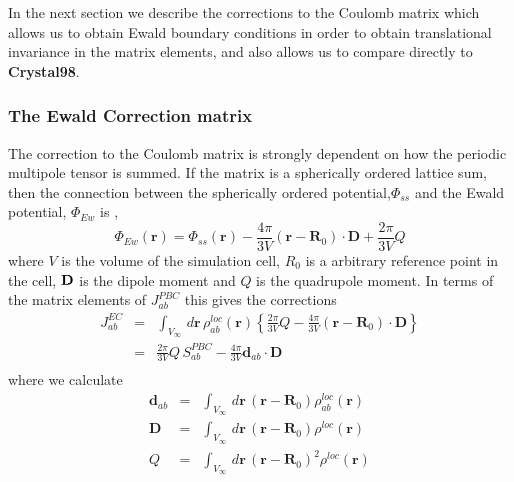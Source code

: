 \commentoutA{\documentclass[prb,aps,twocolumn,showpacs,twocolumngrid,superbib]{revtex4}}
\begin{document}
In the next section we describe the corrections to the Coulomb matrix
which allows us to obtain Ewald boundary conditions in order to obtain
translational invariance in the matrix elements, and also allows us
to compare directly to \textbf{Crystal98}. 

\subsubsection{The Ewald Correction matrix}

The correction to the Coulomb matrix is strongly dependent on how
the periodic multipole tensor is summed. If the matrix is a spherically
ordered lattice sum, then the connection between the spherically ordered
potential,$\Phi _{ss}$ and the Ewald potential, $\Phi _{Ew}$ is \cite{Redlack72}, 
\begin{equation}
\Phi _{Ew}\left( \mathbf{r}\right) =\Phi _{ss}\left( \mathbf{r}\right) -\frac{4\pi }{3V}
{\left( \mathbf{r}-\mathbf{R}_{0}\right) \cdot \mathbf{D}}+\frac{2\pi }{3V}Q
\label{EW_pot}
\end{equation}
where $V$ is the volume of the simulation cell, $R_0$ is a arbitrary reference point in the cell, 
${\bf D}$ is the dipole moment and $Q$ is the quadrupole moment.
In terms of the matrix elements of \( J_{ab}^{PBC} \) this gives
the corrections
\begin{eqnarray}
J_{ab}^{EC} & = & \int _{V_{\infty }}\, d{\mathbf{r}}\, \rho ^{loc}_{ab}\left( {\mathbf{r}}
\right) \left\{ \frac{2\pi }{3V}Q-\frac{4\pi }{3V}\left( \mathbf{r}-\mathbf{R}_{0}\right) \cdot 
\mathbf{D}\right\}
\nonumber\\
 & = & \frac{2\pi }{3V}Q\, S_{ab}^{PBC}-\frac{4\pi }{3V}\mathbf{d}_{ab}\cdot \mathbf{D}
\nonumber\\
\label{Jab_ec_2} 
\end{eqnarray}
where we calculate
%
\begin{eqnarray}
{\mathbf{d}}_{ab} & = & \int _{V_{\infty }}\, d{\mathbf{r}}\, \left( \mathbf{r}-\mathbf{R}_{0}\right)
 \rho ^{loc}_{ab}\left( \mathbf{r}\right)
\label{dab} \\
{\mathbf{D}} & = & \int _{V_{\infty }}\, d{\mathbf{r}}\, \left( \mathbf{r}-\mathbf{R}_{0}\right) 
\rho ^{loc}\left( \mathbf{r}\right) 
\label{D} \\
Q & = & \int _{V_{\infty }}\, d{\mathbf{r}}\, \left( \mathbf{r}-\mathbf{R}_{0}\right) ^{2}
\rho ^{loc}\left( \mathbf{r}\right) 
\label{Q} 
\end{eqnarray}
\end{document}
